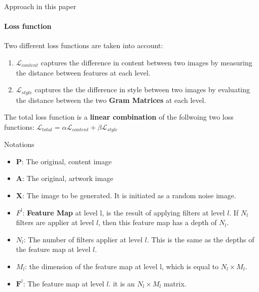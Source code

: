 \documentclass{beamer}
\begin{document}
\begin{frame}{Approach in this paper}
    \framesubtitle{Loss function}
    Two different loss functions are taken into account:
    \begin{enumerate}
        \item $\mathcal{L}_{content}$ captures the difference in content
            between two images by measuring the distance between features at
            each level.
        \item $\mathcal{L}_{style}$ captures the the difference in style
            between two images by evaluating the distance between the two
            \textbf{Gram Matrices} at each level.
    \end{enumerate}
    The total loss function is a
    \textbf{\color{red} linear combination}
    of the follwoing two loss functions:
    $ \mathcal{L}_{total} =
    \alpha \mathcal{L}_{content} +
    \beta \mathcal{L}_{style}$
\end{frame}

\begin{frame}{Notations}
    \begin{itemize}
        \item $\mathbf{P}$: The original, content image
        \item $\mathbf{A}$: The original, artwork image
        \item $\mathbf{X}$: The image to be generated. It is initiated as a
            random noise image.
        \item $F^l$: \textbf{Feature Map} at level l, is the result of applying
            filters at level $l$. If $N_l$ filters are applier at level $l$,
            then this feature map has a depth of $N_l$.
        \item $N_l$: The number of filters applier at level $l$. This is
            the same as the depths of the feature map at level
            $l$.
        \item $M_l$: the dimension of the feature map at level l, which
            is equal to $N_l \times M_l$.
        \item $\mathbf{F}^l$: The feature map at level $l$. it is an
            $N_l \times M_l$ matrix.
    \end{itemize}
\end{frame}
\end{document}
